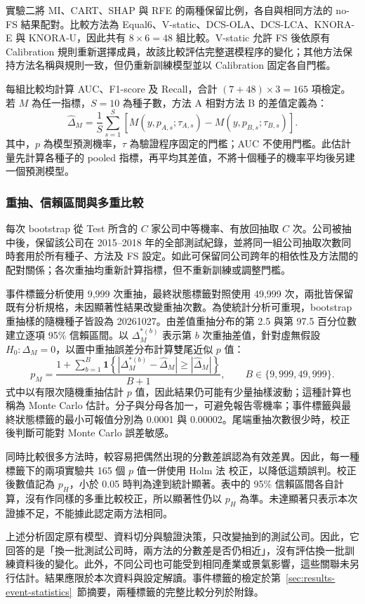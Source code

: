 實驗二將 MI、CART、SHAP 與 RFE 的兩種保留比例，各自與相同方法的 no-FS 結果配對。比較方法為 Equal6、V-static、DCS-OLA、DCS-LCA、KNORA-E 與 KNORA-U，因此共有 \(8\times6=48\) 組比較。V-static 允許 FS 後依原有 Calibration 規則重新選擇成員，故該比較評估完整選模程序的變化；其他方法保持方法名稱與規則一致，但仍重新訓練模型並以 Calibration 固定各自門檻。

每組比較均計算 AUC、F1-score 及 Recall，合計 \((7+48)\times3=165\) 項檢定。若 \(M\) 為任一指標，\(S=10\) 為種子數，方法 A 相對方法 B 的差值定義為：
\begin{equation}\label{eq:stats-difference}
\widehat{\Delta}_M=\frac{1}{S}\sum_{s=1}^{S}
\left[M(y,p_{A,s};\tau_{A,s})-M(y,p_{B,s};\tau_{B,s})\right].
\end{equation}
其中，\(p\) 為模型預測機率，\(\tau\) 為驗證程序固定的門檻；AUC 不使用門檻。此估計量先計算各種子的 pooled 指標，再平均其差值，不將十個種子的機率平均後另建一個預測模型。

\subsubsection{重抽、信賴區間與多重比較}

每次 bootstrap 從 Test 所含的 \(C\) 家公司中等機率、有放回抽取 \(C\) 次。公司被抽中後，保留該公司在 2015--2018 年的全部測試紀錄，並將同一組公司抽取次數同時套用於所有種子、方法及 FS 設定。如此可保留同公司跨年的相依性及方法間的配對關係；各次重抽均重新計算指標，但不重新訓練或調整門檻。

事件標籤分析使用 9,999 次重抽，最終狀態標籤對照使用 49,999 次，兩批皆保留既有分析規格，未因顯著性結果改變重抽次數。為使統計分析可重現，bootstrap 重抽樣的隨機種子皆設為 20261027。由差值重抽分布的第 2.5 與第 97.5 百分位數建立逐項 95\% 信賴區間。以 \(\Delta_M^{*(b)}\) 表示第 \(b\) 次重抽差值，針對虛無假設 \(H_0:\Delta_M=0\)，以置中重抽誤差分布計算雙尾近似 \(p\) 值：
\begin{equation}\label{eq:stats-bootstrap-p}
p_M=\frac{1+\sum_{b=1}^{B}\mathbf{1}\!\left\{
\left|\Delta_M^{*(b)}-\widehat{\Delta}_M\right|\geq
\left|\widehat{\Delta}_M\right|\right\}}{B+1},
\qquad B\in\{9{,}999,49{,}999\}.
\end{equation}
式中以有限次隨機重抽估計 \(p\) 值，因此結果仍可能有少量抽樣波動；這種計算也稱為 Monte Carlo 估計。分子與分母各加一，可避免報告零機率；事件標籤與最終狀態標籤的最小可報值分別為 0.0001 與 0.00002。尾端重抽次數很少時，校正後判斷可能對 Monte Carlo 誤差敏感。

同時比較很多方法時，較容易把偶然出現的分數差誤認為有效差異。因此，每一種標籤下的兩項實驗共 165 個 \(p\) 值一併使用 Holm 法\autocite{holm1979multiple} 校正，以降低這類誤判。校正後數值記為 \(p_H\)，小於 0.05 時判為達到統計顯著。表中的 95\% 信賴區間各自計算，沒有作同樣的多重比較校正，所以顯著性仍以 \(p_H\) 為準。未達顯著只表示本次證據不足，不能據此認定兩方法相同。

上述分析固定原有模型、資料切分與驗證決策，只改變抽到的測試公司。因此，它回答的是「換一批測試公司時，兩方法的分數差是否仍相近」，沒有評估換一批訓練資料後的變化。此外，不同公司也可能受到相同產業或景氣影響，這些關聯未另行估計。結果應限於本次資料與設定解讀。事件標籤的檢定於第~\ref{sec:results-event-statistics}~節摘要，兩種標籤的完整比較分列於附錄。
\endgroup
